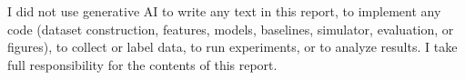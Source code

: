 \documentclass[10pt,twocolumn]{article}
\begin{document}
I did not use generative AI to write any text in this report, to implement any code (dataset construction, features, models, baselines, simulator, evaluation, or figures), to collect or label data, to run experiments, or to analyze results. I take full responsibility for the contents of this report.



\end{document}

